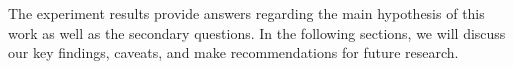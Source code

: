 The experiment results provide answers regarding the main hypothesis of this work as well as the secondary questions. In the following sections, we will discuss our key findings, caveats, and make recommendations for future research.

